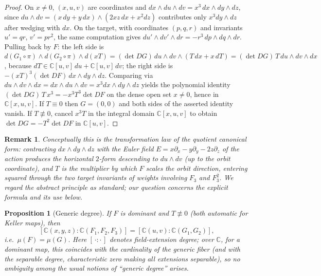 \documentclass[11pt]{article}
\newtheorem{proposition}{Proposition}
\newtheorem{remark}{Remark}
\newcommand{\C}{\mathbb{C}}
\begin{document}
\begin{proof}
On $x\neq0$, $(x,u,v)$ are coordinates and
$dx\wedge du\wedge dv=x^{3}\,dx\wedge dy\wedge dz$, since
$du\wedge dv=(x\,dy+y\,dx)\wedge(2xz\,dx+x^{2}dz)$ contributes only
$x^{3}dy\wedge dz$ after wedging with $dx$. On the target, with coordinates
$(p,q,r)$ and invariants $u'=qr$, $v'=pr^{2}$, the same computation gives
$du'\wedge dv'\wedge dr=-r^{3}\,dp\wedge dq\wedge dr$. Pulling back by $F$:
the left side is
$d(G_1\!\circ\!\pi)\wedge d(G_2\!\circ\!\pi)\wedge d(xT)
=(\det DG)\,du\wedge dv\wedge(T\,dx+x\,dT)
=(\det DG)\,T\,du\wedge dv\wedge dx$,
because $dT\in\C[u,v]\,du+\C[u,v]\,dv$; the right side is
$-(xT)^{3}(\det DF)\,dx\wedge dy\wedge dz$. Comparing via
$du\wedge dv\wedge dx=dx\wedge du\wedge dv=x^{3}dx\wedge dy\wedge dz$
yields the polynomial identity $(\det DG)\,T\,x^{3}=-x^{3}T^{3}\det DF$ on the
dense open set $x\neq0$, hence in $\C[x,u,v]$. If $T\equiv0$ then $G=(0,0)$
and both sides of the asserted identity vanish. If $T\not\equiv0$, cancel
$x^{3}T$ in the integral domain $\C[x,u,v]$ to obtain
$\det DG=-T^{2}\det DF$ in $\C[u,v]$.
\end{proof}

\begin{remark}
Conceptually this is the transformation law of the quotient canonical form: contracting
$dx\wedge dy\wedge dz$ with the Euler field $E=x\partial_x-y\partial_y-2z\partial_z$
of the action produces the horizontal $2$-form descending to $du\wedge dv$ (up to the
orbit coordinate), and $T$ is the multiplier by which $F$ scales the orbit direction,
entering squared through the two target invariants of weights involving $F_3$ and
$F_3^2$. We regard the abstract principle as standard; our question concerns the
explicit formula and its use below.
\end{remark}

\begin{proposition}[Generic degree]
If $F$ is dominant and $T\not\equiv0$ (both automatic for Keller maps), then
\[
[\C(x,y,z):\C(F_1,F_2,F_3)]=[\C(u,v):\C(G_1,G_2)],
\]
i.e.\ $\mu(F)=\mu(G)$. Here $[\,\cdot:\cdot\,]$ denotes field-extension
degree; over $\C$, for a dominant map, this coincides with the cardinality of
the generic fiber (and with the separable degree, characteristic zero making
all extensions separable), so no ambiguity among the usual notions of
``generic degree'' arises.
\end{proposition}
\end{document}
